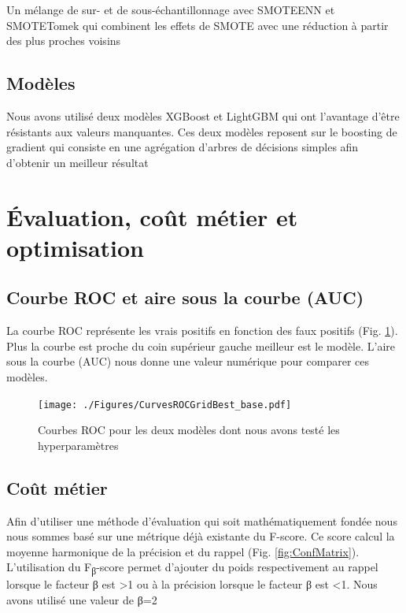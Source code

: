 \documentclass[12pt, a4paper]{article}
\begin{document}
Un mélange de sur- et de sous-échantillonnage avec SMOTEENN et SMOTETomek qui combinent les effets de SMOTE avec une réduction à partir des plus proches voisins

\subsection{Modèles}

Nous avons utilisé deux modèles XGBoost et LightGBM qui ont l'avantage d'être résistants aux valeurs manquantes. Ces deux modèles reposent sur le boosting de gradient qui consiste en une agrégation d'arbres de décisions simples afin d'obtenir un meilleur résultat

\section{Évaluation, coût métier et optimisation}

\subsection{Courbe ROC et aire sous la courbe (AUC)}

La courbe ROC représente les vrais positifs en fonction des faux positifs (Fig. \ref{fig:ROCCurves}).
Plus la courbe est proche du coin supérieur gauche meilleur est le modèle.
L'aire sous la courbe (AUC) nous donne une valeur numérique pour comparer ces modèles.

\begin{figure}[h]
    \begin{center}
        \texttt{[image: ./Figures/CurvesROCGridBest\_base.pdf]}
    \end{center}
    \caption{Courbes ROC pour les deux modèles dont nous avons testé les hyperparamètres}
    \label{fig:ROCCurves}
\end{figure}

\subsection{Coût métier}

Afin d'utiliser une méthode d'évaluation qui soit mathématiquement fondée nous nous sommes basé sur une métrique déjà existante du F-score.
Ce score calcul la moyenne harmonique de la précision et du rappel (Fig. \ref{fig:ConfMatrix}).
L'utilisation du F\textsubscript{β}-score permet d'ajouter du poids respectivement au rappel lorsque le facteur β est \num{>1} ou à la précision lorsque le facteur β est \num{<1}.
Nous avons utilisé une valeur de β=2
\end{document}
